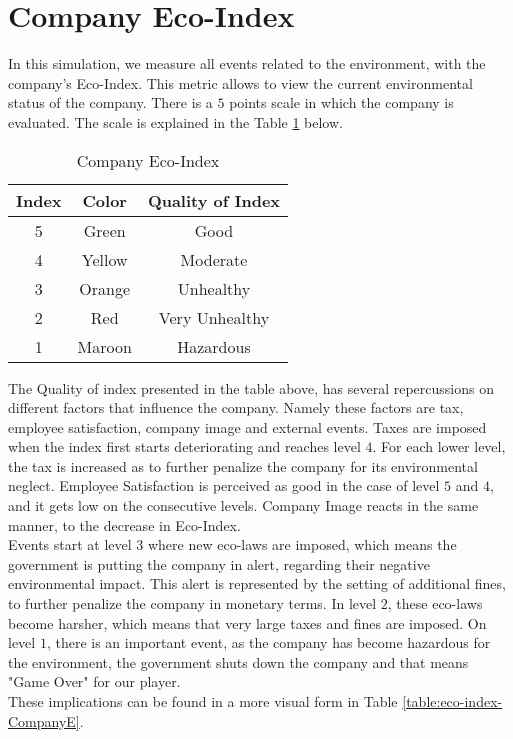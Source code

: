 \section{Company Eco-Index}
\label{sec:compEco-idex}
In this simulation, we measure all events related to the environment, with the company's Eco-Index. This metric allows to view the current environmental status of the company. There is a $5$ points scale in which the company is evaluated. The scale is explained in the Table \ref{table:eco-index-Company} below. \\
\begin{table}[ht]
\centering
\begin{tabular}{|c|c|c|}
\hline
 Index & Color & Quality of Index \\
\hline
 5 & \cellcolor[HTML]{228b22}Green & Good \\ \hline
 4 & \cellcolor[HTML]{ffff00}Yellow & Moderate \\  \hline
 3 & \cellcolor[HTML]{ffd700}Orange & Unhealthy\\ \hline
 2 & \cellcolor[HTML]{ff0000}Red & Very Unhealthy \\ \hline
 1 & \cellcolor[HTML]{a52a2a}Maroon & Hazardous \\
\hline
\end{tabular}
\caption{Company Eco-Index}
\label{table:eco-index-Company}
\end{table}

The Quality of index presented in the table above, has several repercussions on different factors that influence the company. Namely these factors are tax, employee satisfaction, company image and external events. Taxes are imposed when the index first starts deteriorating and reaches level $4$. For each lower level, the tax is increased as to further penalize the company for its environmental neglect. Employee Satisfaction is perceived as good in the case of level $5$ and $4$, and it gets low on the consecutive levels. Company Image reacts in the same manner, to the decrease in Eco-Index.\\ 
Events start at level $3$ where new eco-laws are imposed, which means the government is putting the company in alert, regarding their negative environmental impact. This alert is represented by the setting of additional fines, to further penalize the company in monetary terms. In level $2$, these eco-laws become harsher, which means that very large taxes and fines are imposed. On level $1$, there is an important event, as the company has become hazardous for the environment, the government shuts down the company and that means "Game Over" for our player. \\
 These implications can be found in a more visual form in Table \ref{table:eco-index-CompanyE}.

